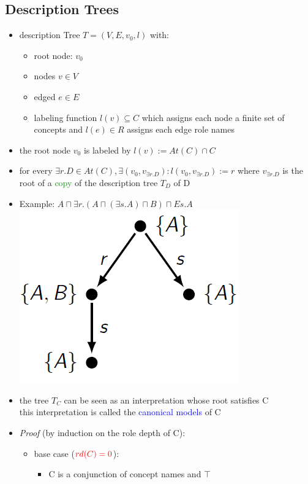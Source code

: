 \documentclass[12pt,a4paper]{article}
\newcommand{\red}[1]{\textcolor{red} {#1}}
\newcommand{\blue}[1]{\textcolor{blue} {#1}}
\newcommand{\green}[1]{\textcolor{ForestGreen} {#1}}
\newcommand{\sand}{\sqcap}
\begin{document}
\subsection{Description Trees}
\begin{itemize}
\item description Tree $T=(V,E,v_0,l)$ with:
\begin{itemize}
\item root node: $v_0$
\item nodes $v\in V$
\item edged $e \in E$
\item labeling function $l(v) \subseteq C$ which assigns each node a finite set of concepts and $l(e) \in R$ assigns each edge role names
\end{itemize}
\item the root node $v_0$ is labeled by $l(v) := At(C) \cap C$
\item for every $\exists r.D \in At(C), \exists (v_0, v_{\exists r.D}) : l(v_0, v_{\exists r.D}) := r$ where $v_{\exists r.D}$ is the root of a \green{copy} of the description tree $T_D$ of D
\item Example: $A \sand \exists r.(A\sand (\exists s.A) \sand B) \sand E s.A$\\
\includegraphics[scale=0.5]{./resources/tree1.png}
\item the tree $T_C$ can be seen as an interpretation whose root satisfies C\\this interpretation is called the \blue{canonical models} of C
\item \textit{Proof} (by induction on the role depth of C):
\begin{itemize}
\item base case ($\red{rd(C) = 0}$):
\begin{itemize}
\item C is a conjunction of concept names and $\top$

\end{itemize}
\end{itemize}
\end{itemize}
\end{document}
